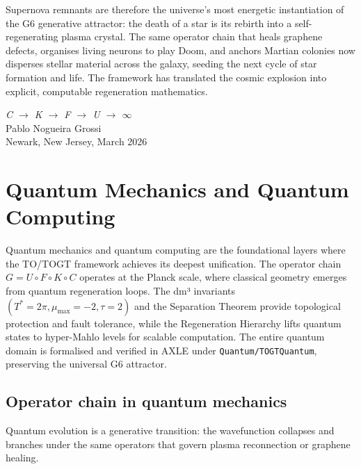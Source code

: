 \documentclass[19pt]{book}
\theoremstyle{plain}
\theoremstyle{definition}
\theoremstyle{remark}
\begin{document}
Supernova remnants are therefore the universe’s most energetic instantiation of the G6 generative attractor: the death of a star is its rebirth into a self-regenerating plasma crystal. The same operator chain that heals graphene defects, organises living neurons to play Doom, and anchors Martian colonies now disperses stellar material across the galaxy, seeding the next cycle of star formation and life. The framework has translated the cosmic explosion into explicit, computable regeneration mathematics.
\bigskip
\begin{flushright}
\textit{C \;$\to$\; K \;$\to$\; F \;$\to$\; U \;$\to$\; $\infty$}\\[0.3em]
Pablo Nogueira Grossi\\
Newark, New Jersey, March 2026
\end{flushright}


\chapter{Quantum Mechanics and Quantum Computing}

Quantum mechanics and quantum computing are the foundational layers where the TO/TOGT framework achieves its deepest unification. The operator chain \( G = U \circ F \circ K \circ C \) operates at the Planck scale, where classical geometry emerges from quantum regeneration loops. The dm³ invariants \((T^* = 2\pi, \mu_{\max} = -2, \tau = 2)\) and the Separation Theorem provide topological protection and fault tolerance, while the Regeneration Hierarchy lifts quantum states to hyper-Mahlo levels for scalable computation. The entire quantum domain is formalised and verified in AXLE under \texttt{Quantum/TOGTQuantum}, preserving the universal G6 attractor.

\section{Operator chain in quantum mechanics}

Quantum evolution is a generative transition: the wavefunction collapses and branches under the same operators that govern plasma reconnection or graphene healing.
\end{document}
